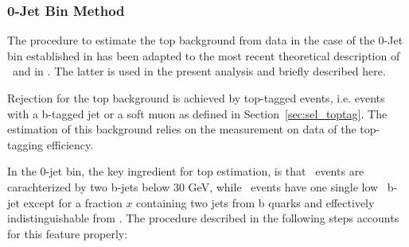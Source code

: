 
%
%
\subsubsection{0-Jet Bin Method}

The procedure to estimate the top background from data in the case of
the 0-Jet bin established in \cite{HWW2011} has been adapted to the
most recent theoretical description of \ttbar\ and \tw{} in \cite{HWWFull2011}.
The latter is used in the present analysis and briefly described here.

Rejection for the top background is achieved by top-tagged events,
i.e. events with a b-tagged jet or a soft muon as defined in
Section~\ref{sec:sel_toptag}.  The estimation of this background
relies on the measurement on data of the top-tagging efficiency.  

In the 0-jet bin, the key ingredient for top estimation, is that \ttbar\ events 
are carachterized by two b-jets below 30 GeV, while \tw\ events have one 
single low \pt\ b-jet except for a fraction $x$ containing two jets from 
b quarks and effectively indistinguishable from \ttbar.
The procedure described in the following steps accounts for this feature properly:

